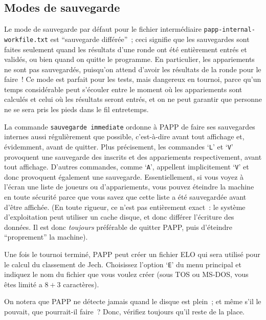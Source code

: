 \documentclass[10pt]{article}
\begin{document}
\subsection{Modes de sauvegarde}

Le mode de sauvegarde par d\'efaut pour le fichier interm\'ediaire 
\verb|papp-internal-workfile.txt| est ``sauvegarde diff\'er\'ee''~; ceci signifie que 
les sauvegardes sont faites seulement quand les r\'esultats d'une 
ronde ont \'et\'e enti\`erement entr\'es et valid\'es, ou bien quand 
on quitte le programme.  En particulier, les appariements ne sont pas 
sauvegard\'es, puisqu'on attend d'avoir les r\'esultats de la ronde 
pour le faire~!  Ce mode est parfait pour les tests, mais dangereux en 
tournoi, parce qu'un temps consid\'erable peut s'\'ecouler entre le 
moment o\`u les appariements sont calcul\'es et celui o\`u les 
r\'esultats seront entr\'es, et on ne peut garantir que personne ne se 
sera pris les pieds dans le fil entretemps.

La commande \verb|sauvegarde immediate| ordonne \`a PAPP de faire ses 
sauve\-gardes internes aussi r\'eguli\`erement que possible, 
c'est-\`a-dire avant tout affichage et, \'evidemment, avant de 
quitter.  Plus pr\'ecisement, les commandes `\verb|L|' et `\verb|V|' 
provoquent une sauvegarde des inscrits et des appariements 
respectivement, avant tout affichage.  D'autres commandes, comme 
`\verb|A|', appellent implicitement `\verb|V|' et donc provoquent 
\'egalement une sauvegarde.  Essentiellement, si vous voyez \`a 
l'\'ecran une liste de joueurs ou d'appariements, vous pouvez 
\'eteindre la machine en toute s\'ecurit\'e parce que vous savez que 
cette liste a \'et\'e sauvegard\'ee avant d'\^etre affich\'ee.  (En 
toute rigueur, ce n'est pas enti\`erement exact~: le syst\`eme 
d'exploitation peut utiliser un cache disque, et donc diff\'erer 
l'\'ecriture des donn\'ees.  Il est donc {\em toujours\/} 
pr\'ef\'erable de quitter PAPP, puis d'\'eteindre ``proprement'' la 
machine).

Une fois le tournoi termin\'e, PAPP peut cr\'eer un fichier ELO
qui sera utilis\'e pour le calcul du classement de Jech.  Choisissez
l'option `\verb|E|' du menu principal et indiquez le nom du fichier que vous
voulez cr\'eer (sous TOS ou MS-DOS, vous \^etes limit\'e a $8+3$
caract\`eres).

On notera que PAPP ne d\'etecte jamais quand le disque est
plein~; et m\^eme s'il le pouvait, que pourrait-il faire~?  Donc, v\'erifiez
toujours qu'il reste de la place.
\end{document}
